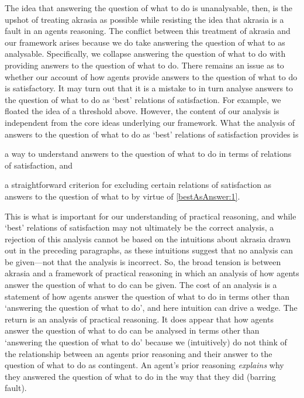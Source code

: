\documentclass[10pt]{article}
\begin{document}
The idea that answering the question of what to do is unanalysable, then, is the upshot of treating akrasia as possible while resisting the idea that akrasia is a fault in an agents reasoning.
The conflict between this treatment of akrasia and our framework arises because we do take answering the question of what to as analysable.
Specifically, we collapse answering the question of what to do with providing answers to the question of what to do.
There remains an issue as to whether our account of how agents provide answers to the question of what to do is satisfactory.
It may turn out that it is a mistake to in turn analyse answers to the question of what to do as `best' relations of satisfaction.
For example, we floated the idea of a threshold above.
However, the content of our analysis is independent from the core ideas underlying our framework.
What the analysis of answers to the question of what to do as `best' relations of satisfaction provides is
\begin{enumerate*}[label=\alph*)]
\item\label{bestAsAnswer:1} a way to understand answers to the question of what to do in terms of relations of satisfaction, and
\item\label{bestAsAnswer:2} a straightforward criterion for excluding certain relations of satisfaction as answers to the question of what to by virtue of \ref{bestAsAnswer:1}.
\end{enumerate*}
This is what is important for our understanding of practical reasoning, and while `best' relations of satisfaction may not ultimately be the correct analysis, a rejection of this analysis cannot be based on the intuitions about akrasia drawn out in the preceding paragraphs, as these intuitions suggest that no analysis can be given---not that the analysis is incorrect.
So, the broad tension is between akrasia and a framework of practical reasoning in which an analysis of how agents answer the question of what to do can be given.
The cost of an analysis is a statement of how agents answer the question of what to do in terms other than `answering the question of what to do', and here intuition can drive a wedge.
The return is an analysis of practical reasoning.
It does appear that how agents answer the question of what to do can be analysed in terms other than `answering the question of what to do' because we (intuitively) do not think of the relationship between an agents prior reasoning and their answer to the question of what to do as contingent.
An agent's prior reasoning \emph{explains} why they answered the question of what to do in the way that they did (barring fault).
\end{document}
